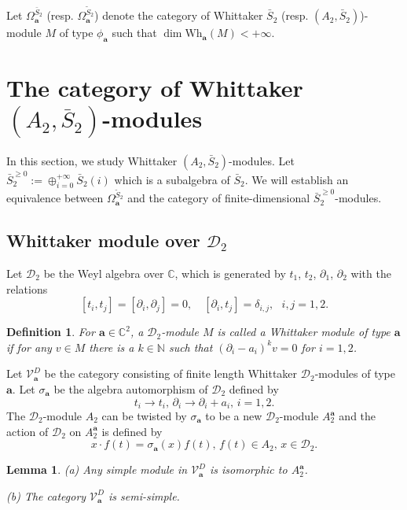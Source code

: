 \documentclass[12pt,a4paper]{amsart}
\newtheorem{Definition}[Theorem]{Definition}
\newtheorem{Lemma}[Theorem]{Lemma}
\def\C{\mathbb{C}}
\def\ba{\mathbf{a}}
\begin{document}
Let $\Omega^{\bar{S}_2}_{\ba}$ (resp. $\Omega^{\widetilde{S}_2}_{\ba}$) denote the category of Whittaker $\bar{S}_2$ (resp. $(A_2,\bar{S}_2)$)-module $M$ of type $\phi_\ba$ such that $\dim \text{Wh}_\ba(M)< +\infty$.




\section{The category of Whittaker $(A_2,\bar{S}_2)$-modules}
In this section, we study Whittaker $(A_2,\bar{S}_2)$-modules.
Let $\bar{S}_2^{\geq 0}:=\oplus_{i=0}^{+\infty}\bar{S}_2(i)$ which is a subalgebra of $\bar{S}_2$.
We  will establish an equivalence between $\Omega^{\widetilde{S}_2}_\ba$ and the category of finite-dimensional $\bar{S}_2^{\geq 0}$-modules.

\subsection{Whittaker module over $\mathcal{D}_2$}
Let $\mathcal{D}_2$ be the Weyl algebra over $\mathbb{C}$,  which is generated by $t_1$, $t_2$, $\partial_1$, $\partial_2$ with the relations
$$[t_i,t_j]=[\partial_i,\partial_j]=0, \,\,\,\,\,\,  [\partial_i,t_j]=\delta_{i,j}, \,\,\,\,  i,j=1,2.$$

\begin{Definition} For $\ba\in \C^2$,
 a $\mathcal{D}_2$-module $M$ is called a Whittaker module of type $\ba$ if for any $v\in M$ there is a $k\in \mathbb{N}$ such that $(\partial_i-a_i)^{k}v=0$ for $i=1,2$.
\end{Definition}

Let $\mathcal{V}^{D}_\ba$ be the category consisting of finite length Whittaker $\mathcal{D}_2$-modules of type $\ba$. Let $\sigma_\ba$ be the algebra automorphism of $\mathcal{D}_2$ defined by
$$t_i\rightarrow t_i, \, \partial_i \rightarrow \partial_i+a_i, \, i=1,2.$$
The $\mathcal{D}_2$-module $A_2$ can be twisted by $\sigma_\ba$ to be a new $\mathcal{D}_2$-module $A^{\ba}_2$ and the action of $\mathcal{D}_2$ on $A^{\ba}_2$ is defined by
$$x\cdot f(t)=\sigma_\ba(x)f(t), \, f(t)\in A_2, \, x\in \mathcal{D}_2.$$

\begin{Lemma}\label{Weyl-module} \emph{\cite{YG}}
(a) Any simple module in $\mathcal{V}^{D}_\ba$ is isomorphic to $A^{\ba}_2$.

(b) The category $\mathcal{V}^{D}_\ba$ is semi-simple.
\end{Lemma}
\end{document}
